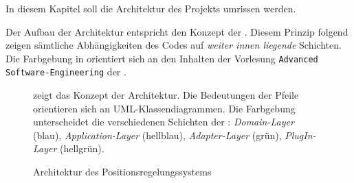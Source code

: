 
In diesem Kapitel soll die Architektur des Projekts umrissen werden. 


Der Aufbau der Architektur entspricht den Konzept der \clean. Diesem Prinzip folgend zeigen sämtliche Abhängigkeiten des Codes auf \textit{weiter innen liegende} Schichten.
Die Farbgebung in  orientiert sich an den Inhalten der Vorlesung \texttt{Advanced Software-Engineering} der \DHBW.




\begin{figure}[ht!]
\vspace{0.25cm}
\begin{center}
\caption{Architektur des Positionsregelungssystems}
\label{fig:Arch}
\end{center}

\vspace{0.25cm}
 zeigt das Konzept der Architektur. Die Bedeutungen der Pfeile orientieren sich an UML-Klassendiagrammen. Die Farbgebung unterscheidet die verschiedenen Schichten der \clean: \textit{Domain-Layer} (blau), \textit{Application-Layer} (hellblau), \textit{Adapter-Layer} (grün), \textit{PlugIn-Layer} (hellgrün).
\end{figure}





